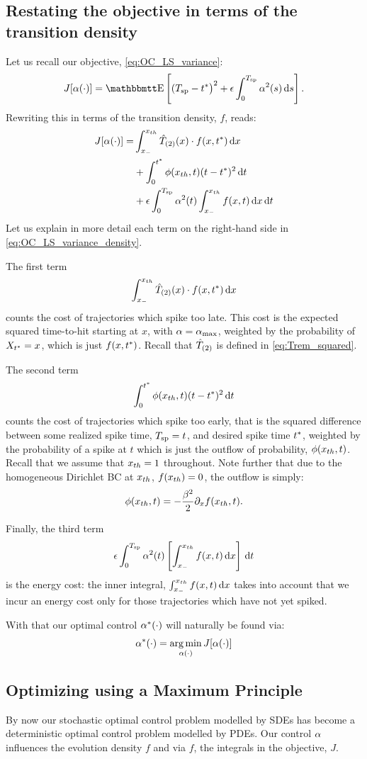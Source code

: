 \documentclass[12pt]{iopart}
\begin{document}
\subsection{Restating the objective in terms of the transition density}
Let us recall our objective, \cref{eq:OC_LS_variance}:
$$
J[\a(\cdot)] = \Exp\left[
(\ts - \T \big)^2
+
\e \int_0^\ts  \a^2(s) \intd{s}
\right].
$$
Rewriting this in terms of the transition density, $f$, reads:
\begin{align}
J[{\alpha}(\cdot)] =&
\int_{ x_{-} }^{ x_{th} } { \hat{T}_{(2)} }(x) \cdot f(x,{ t^* }) \, \mathrm{d} x
\notag
\\
&+ \int_0^{ t^* } \phi({ x_{th} }, t) (t-{ t^* })^2 \, \mathrm{d} t
\label{eq:OC_LS_variance_density}
\\
&+  {\epsilon} \int_0^{ T_{\textrm{sp} } }  {\alpha}^2(t)  \int_{ x_{-} }^{ x_{th} } f(x,t) \, \mathrm{d} x \, \mathrm{d} t
\notag
\end{align}
Let us explain in more detail each term on the right-hand side in
\cref{eq:OC_LS_variance_density}.

The first term $$ \int_{ x_{-} }^{ x_{th} } { \hat{T}_{(2)} }(x) \cdot f(x,{ t^* })\, \mathrm{d} x $$ counts the cost of trajectories which spike too late. This cost is the expected
squared time-to-hit starting at $x$, with  ${\alpha} = { {\alpha}_{\textrm{max}} }$, weighted by the
probability of $X_{ t^* } = x$, which is just $f(x,{ t^* })$. Recall that ${ \hat{T}_{(2)} }$ is
defined in \cref{eq:Trem_squared}.

The second term $$ \int_0^{ t^* } \phi({ x_{th} },t) (t-{ t^* })^2 \, \mathrm{d} t $$ counts the cost
of trajectories which spike too early, that is the squared difference between
some realized spike time, ${ T_{\textrm{sp} } } = t$, and desired spike time ${ t^* }$, weighted by
the probability of a spike at $t$ which is just the outflow of probability,
$\phi({ x_{th} },t)$. Recall that we assume that ${ x_{th} } = 1$ throughout. Note further
that due to the homogeneous Dirichlet BC at ${ x_{th} }$, $f({ x_{th} }) = 0$, the outflow
is simply: $$ \phi({ x_{th} }, t) = -\frac{{\beta}^2 }{2} {\partial}_x f({ x_{th} }, t).$$

Finally, the third term
$$
{\epsilon} \int_0^{ T_{\textrm{sp} } }  {\alpha}^2(t)  \left[  \int_{ x_{-} }^{ x_{th} } f(x,t) \, \mathrm{d} x \right] \, \mathrm{d} t
$$
is the energy cost: the inner integral, $\int_{ x_{-} }^{ x_{th} } f(x,t) \, \mathrm{d} x$
takes into account that we incur an energy cost only for those trajectories
which have not yet spiked.

With that our optimal control ${\alpha}^*(\cdot)$ will naturally be found via:
$$
\a^*(\cdot) = \argmin_{\a(\cdot)} J[\a(\cdot)]
$$

\subsection{Optimizing using a Maximum Principle}
\label{sec:PDE_max_principle_for_pdf}
By now our stochastic optimal control problem modelled by SDEs
has become a deterministic optimal control problem modelled by PDEs. Our control
${\alpha}$ influences the evolution density $f$ and via $f$, the integrals in the
objective, $J$.
\end{document}
